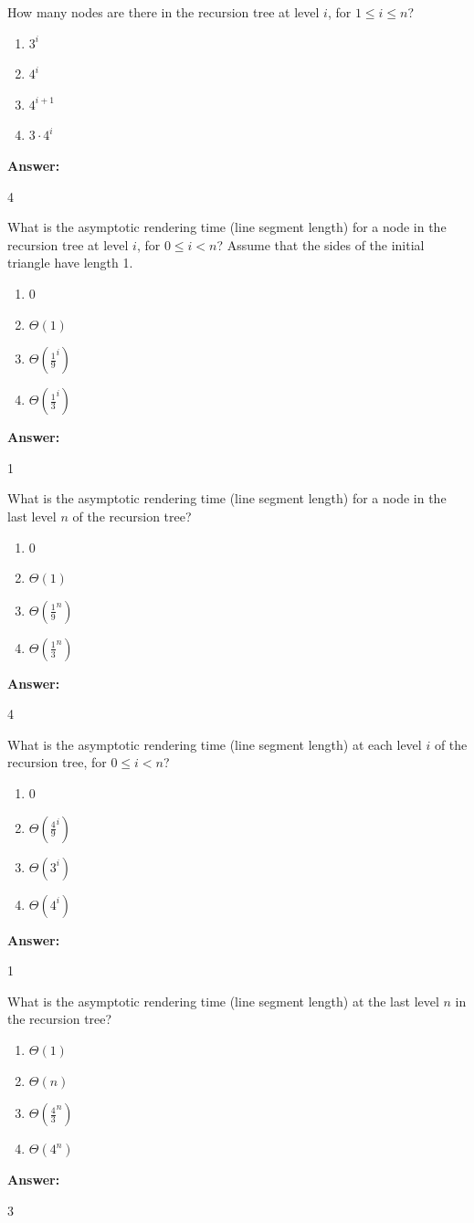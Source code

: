 \documentclass[12pt,twoside]{article}
\newcommand{\answer}{
 \par\medskip
 \textbf{Answer:}
}
\newcommand{\answerIn}{ \answer
4
}
\newcommand{\answerIo}{ \answer
1
}
\newcommand{\answerIp}{ \answer
4
}
\newcommand{\answerIq}{ \answer
1
}
\newcommand{\answerIr}{ \answer
3
}
\begin{document}
\begin{problems}
\begin{problemparts}
  \problempart {} How many nodes are there in the recursion tree at level
  $i$, for $1 \le i \le n$?
    \begin{enumerate}
      \item $3 ^ i$
      \item $4 ^ i$
      \item $4 ^ {i + 1}$
      \item $3 \cdot 4 ^ i$
    \end{enumerate}
\answerIn

  \problempart {} What is the asymptotic rendering time (line segment length)
  for a node in the recursion tree at level $i$, for $0 \le i < n$? Assume that
  the sides of the initial triangle have length 1.
    \begin{enumerate}
      \item $0$
      \item $\Theta(1)$
      \item $\Theta(\frac{1}{9}^i)$
      \item $\Theta(\frac{1}{3}^i)$
    \end{enumerate}
\answerIo

  \problempart {} What is the asymptotic rendering time (line segment length)
  for a node in the last level $n$ of the recursion tree?
    \begin{enumerate}
      \item $0$
      \item $\Theta(1)$
      \item $\Theta(\frac{1}{9}^n)$
      \item $\Theta(\frac{1}{3}^n)$
    \end{enumerate}
\answerIp

  \problempart {} What is the asymptotic rendering time (line segment length)
  at each level $i$ of the recursion tree, for $0 \le i < n$?
    \begin{enumerate}
      \item 0
      \item $\Theta(\frac{4}{9} ^ i)$
      \item $\Theta(3 ^ i)$
      \item $\Theta(4 ^ i)$
    \end{enumerate}
\answerIq

  \problempart {} What is the asymptotic rendering time (line segment length)
  at the last level $n$ in the recursion tree?
    \begin{enumerate}
      \item $\Theta(1)$
      \item $\Theta(n)$
      \item $\Theta(\frac{4}{3}^n)$
      \item $\Theta(4^n)$
    \end{enumerate}
\answerIr


\end{problemparts}
\end{problems}
\end{document}
